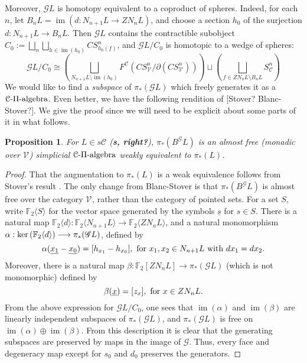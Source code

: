 \documentclass[11pt]{amsart}
\theoremstyle{plain}
\newtheorem{prop}[thm]{Proposition}
\theoremstyle{definition}
\renewcommand{\ker}{\textup{ker}\,}
\DeclareMathOperator{\im}{im}
\renewcommand{\to}{\longrightarrow}
\newcommand{\scrG}{\mathscr{G}}
\newcommand{\calV}{\mathcal{V}}
\newcommand{\calc}{\mathcal{C}}
\theoremstyle{plain}
\newcommand{\vect}[2]{\calV^{#1}_{#2}}
\newcommand{\BSW}{{\scrG}}
\newcommand{\F}{\mathbb{F}}
\newcommand{\Ftwo}{\F_2}
\begin{document}
\begin{Composite functor spectral sequences}
Moreover, $\BSW L$ is homotopy equivalent to a coproduct of spheres. Indeed, for each $n$, let $B_nL=\im (d:N_{n+1}L\to ZN_nL)$, and choose a section $h_0$ of the surjection $d:N_{n+1}L\to B_nL$. Then $\BSW L$ contains the contractible subobject $C_0:=\bigsqcup_n\bigsqcup_{h\in \im (h_0)} CS^n_{h_0(f)}$, and $\BSW L/C_0$ is homotopic to a wedge of spheres:
\[\BSW L/C_0\cong \left(\bigsqcup_{N_{n+1}L\setminus\im (h_0)}F^\calc (CS^n_{\vect{}{}}/\partial(CS^n_{\vect{}{}}))\right) \sqcup\left(\bigsqcup_{f\in ZN_nL\setminus B_nL}S^n_\calc\right)\]
We would like to find a \emph{subspace} of $\pi_*(\BSW L)$ which freely generates it as a $\calc\textup{-$\Pi$-algebra}$. Even better, we have the following rendition of [Stover? Blanc-Stover?]. We give the proof since we will need to be explicit about some parts of it in what follows.
\begin{prop}
For $L\in s\calc$ (\textbf{s, right?}), $\pi_*(B^{\BSW}L)$ is an almost free (monadic over $\vect{}{}$) simplicial $\calc\textup{-$\Pi$-algebra}$ weakly equivalent to $\pi_*(L)$.
\end{prop}
\begin{proof}
That the augmentation to $\pi_*(L)$ is a weak equivalence follows from Stover's result \cite[2.7]{StoverVanKampen.pdf}. The only change from Blanc-Stover is that $\pi_*(B^{\BSW}L)$ is almost free over the category $\vect{}{}$, rather than the category of pointed sets.
For a set $S$, write $\Ftwo \langle S\rangle$ for the vector space generated by the symbols $\underline{s}$ for $s\in S$. There is a natural map $\Ftwo \langle d\rangle :\Ftwo \langle N_{n+1}L\rangle \to \Ftwo \langle ZN_nL\rangle $, and a natural monomorphism $\alpha:\ker(\Ftwo \langle d\rangle)\to \pi_*(\BSW L)$, defined by
\[\alpha(\underline{x_1}-\underline{x_0})=[h_{x_1}-h_{x_0}],\textup{ for $x_1,x_2\in N_{n+1}L$ with $dx_1=dx_2$}.\]
Moreover, there is a natural map $\beta:\Ftwo [ZN_nL]\to\pi_*(\BSW L)$ (which is not monomorphic) defined by
\[\beta(\underline{x})=[z_{x}],\textup{ for $x\in ZN_{n}L$}.\]
From the above expression for $\BSW L/C_0$, one sees that $\im (\alpha)$ and $\im (\beta)$ are linearly independent subspaces of $\pi_*(\BSW L)$, and $\pi_*(\BSW L)$ is free on $\im (\alpha)\oplus\im (\beta)$. From this description it is clear that the generating subspaces are preserved by maps in the image of $\BSW $. Thus, every face and degeneracy map except for $s_0$ and $d_0$ preserves the generators.


\end{proof}
\end{Composite functor spectral sequences}
\end{document}
